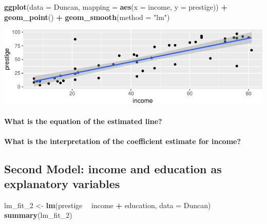 \documentclass[]{extarticle}
\newenvironment{Shaded}{\begin{snugshade}}{\end{snugshade}}
\newcommand{\KeywordTok}[1]{\textcolor[rgb]{0.13,0.29,0.53}{\textbf{#1}}}
\newcommand{\DataTypeTok}[1]{\textcolor[rgb]{0.13,0.29,0.53}{#1}}
\newcommand{\DecValTok}[1]{\textcolor[rgb]{0.00,0.00,0.81}{#1}}
\newcommand{\StringTok}[1]{\textcolor[rgb]{0.31,0.60,0.02}{#1}}
\newcommand{\OperatorTok}[1]{\textcolor[rgb]{0.81,0.36,0.00}{\textbf{#1}}}
\newcommand{\NormalTok}[1]{#1}
\let\oldparagraph\paragraph
\renewcommand{\paragraph}[1]{\oldparagraph{#1}\mbox{}}
\begin{document}
\begin{Shaded}
\begin{Highlighting}[]
\KeywordTok{ggplot}\NormalTok{(}\DataTypeTok{data =}\NormalTok{ Duncan, }\DataTypeTok{mapping =} \KeywordTok{aes}\NormalTok{(}\DataTypeTok{x =}\NormalTok{ income, }\DataTypeTok{y =}\NormalTok{ prestige)) }\OperatorTok{+}
\StringTok{  }\KeywordTok{geom_point}\NormalTok{() }\OperatorTok{+}
\StringTok{  }\KeywordTok{geom_smooth}\NormalTok{(}\DataTypeTok{method =} \StringTok{"lm"}\NormalTok{)}
\end{Highlighting}
\end{Shaded}

\includegraphics{20190417_avPlots_files/figure-latex/unnamed-chunk-5-1.pdf}

\paragraph{What is the equation of the estimated
line?}\label{what-is-the-equation-of-the-estimated-line}

\vspace{3cm}

\paragraph{What is the interpretation of the coefficient estimate for
income?}\label{what-is-the-interpretation-of-the-coefficient-estimate-for-income}

\newpage

\subsection{Second Model: income and education as explanatory
variables}\label{second-model-income-and-education-as-explanatory-variables}

\begin{Shaded}
\begin{Highlighting}[]
\NormalTok{lm_fit_}\DecValTok{2}\NormalTok{ <-}\StringTok{ }\KeywordTok{lm}\NormalTok{(prestige }\OperatorTok{~}\StringTok{ }\NormalTok{income }\OperatorTok{+}\StringTok{ }\NormalTok{education, }\DataTypeTok{data =}\NormalTok{ Duncan)}
\KeywordTok{summary}\NormalTok{(lm_fit_}\DecValTok{2}\NormalTok{)}
\end{Highlighting}
\end{Shaded}
\end{document}
